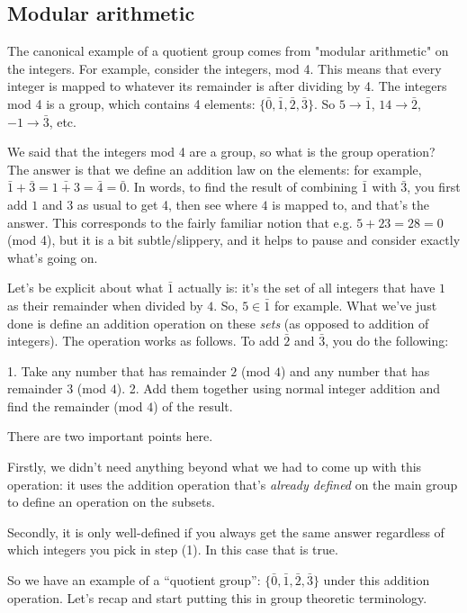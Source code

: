 \subsection{Modular arithmetic}

The canonical example of a quotient group comes from "modular arithmetic" on
the integers. For example, consider the integers, mod 4. This means that every
integer is mapped to whatever its remainder is after dividing by 4. The
integers mod 4 is a group, which contains 4 elements: $\{\bar 0, \bar 1, \bar
2, \bar 3\}$. So $5 \rightarrow \bar 1$, $14 \rightarrow \bar 2$, $-1
\rightarrow \bar 3$, etc.

We said that the integers mod 4 are a group, so what is the group operation?
The answer is that we define an addition law on the elements: for example,
$\bar 1 + \bar 3 = \bar{1 + 3} = \bar 4 = \bar 0$. In words, to find the result
of combining $\bar 1$ with $\bar 3$, you first add $1$ and $3$ as usual to get
4, then see where $4$ is mapped to, and that's the answer. This corresponds to
the fairly familiar notion that e.g. $5 + 23 = 28 = 0$ (mod 4), but it is a bit
subtle/slippery, and it helps to pause and consider exactly what's going on.

Let's be explicit about what $\bar 1$ actually is: it's the set of all integers
that have $1$ as their remainder when divided by $4$. So, $5 \in \bar 1$ for
example. What we've just done is define an addition operation on these
\emph{sets} (as opposed to addition of integers). The operation works as
follows. To add $\bar 2$ and $\bar 3$, you do the following:

1. Take any number that has remainder $2$ (mod $4$) and any number that has
   remainder $3$ (mod $4$).
2. Add them together using normal integer addition and find the remainder (mod
   $4$) of the result.

There are two important points here.

Firstly, we didn't need anything beyond what we had to come up with this
operation: it uses the addition operation that's \emph{already defined} on the
main group to define an operation on the subsets.

Secondly, it is only well-defined if you always get the same answer regardless
of which integers you pick in step (1). In this case that is true.

So we have an example of a ``quotient group'': $\{\bar 0, \bar 1, \bar 2, \bar
3\}$ under this addition operation. Let's recap and start putting this in group
theoretic terminology.

